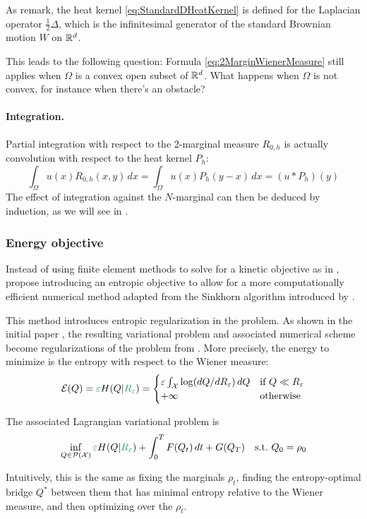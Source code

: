 \documentclass[../report.tex]{subfiles}
\begin{document}
\begin{remark}\label{rem:HeatKernelTopology}
	As \textcite[p.~5]{benamou2018entropy} remark, the heat kernel \eqref{eq:StandardDHeatKernel} is defined for the Laplacian operator $\frac{1}{2}\Delta$, which is the infinitesimal generator of the standard Brownian motion $W$ on $\mathbb{R}^d$.
	
	\noindent This leads to the following question: Formula \eqref{eq:2MarginWienerMeasure} still applies when $\Omega$ is a convex open subset of $\mathbb{R}^d$. What happens when $\Omega$ is not convex, for instance when there's an obstacle?
\end{remark}


\paragraph{Integration.} Partial integration with respect to the 2-marginal measure $R_{0,h}$ is actually convolution with respect to the heat kernel $P_h$:
\[
	\int_\Omega u(x) R_{0,h}(x,y)\,dx =
	\int_\Omega u(x) P_h(y-x)\,dx =
	(u * P_h)(y)
\]
The effect of integration against the $N$-marginal can then be deduced by induction, as we will see in .


\subsubsection{Energy objective}

Instead of using finite element methods to solve for a kinetic objective as in \cite{benamou:hal-01295299}, \textcite{benamou2018entropy} propose introducing an entropic objective to allow for a more computationally efficient numerical method adapted from the Sinkhorn algorithm introduced by \textcite{cuturi2013sinkhorn}.

This method introduces entropic regularization in the problem. As shown in the initial paper \cite{benamou2018entropy}, the resulting variational problem and associated numerical scheme become regularizations of the problem from \cite{benamou:hal-01295299,benamou2015lagrangian}.
More precisely, the energy to minimize is the entropy with respect to the Wiener measure:
\begin{equation}
	\mathcal{E}(Q) = {\greenfont \epsilon} H(Q | {\greenfont R_\epsilon}) =
	\begin{cases}
	\epsilon \int_\calX \log(dQ/dR_\epsilon)\, dQ
	& \mbox{if } Q \ll R_\epsilon  \\
	+\infty & \mbox{otherwise}
	\end{cases}
\end{equation}

The associated Lagrangian variational problem is
\begin{equation}\label{eq:EntropyLagrangianProblem}
	\inf_{Q\in\calP(\calX)}
	{\greenfont\epsilon} H(Q|{\greenfont R_{\epsilon}}) + \int_0^T F(Q_t)\,dt + G(Q_T)\quad
	\suchthat\ Q_0 = \rho_0
\end{equation}

Intuitively, this is the same as fixing the marginals $\rho_t$, finding the entropy-optimal bridge $Q^*$ between them that has minimal entropy relative to the Wiener measure, and then optimizing over the $\rho_t$.
\end{document}

